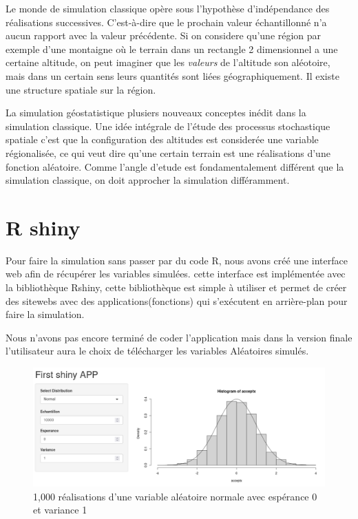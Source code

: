 \documentclass[10pt]{article} %
\begin{document}
Le monde de simulation classique opère sous l'hypothèse d'indépendance des réalisations successives. C'est-à-dire que le prochain
valeur échantillonné n'a aucun rapport avec la valeur précédente. Si on considere qu'une région par exemple d'une montaigne où le terrain
dans un rectangle 2 dimensionnel a une certaine altitude, on peut imaginer que les \textit{valeurs} de l'altitude son aléotoire, mais dans un
certain sens leurs quantités sont liées géographiquement. Il existe une structure spatiale sur la région.

La simulation géostatistique plusiers nouveaux conceptes inédit dans la simulation classique. Une idée intégrale de l'étude des processus
stochastique spatiale c'est que la configuration des altitudes est considerée une variable régionalisée, ce qui veut dire qu'une certain terrain
est une réalisations d'une fonction aléatoire. Comme l'angle d'etude est fondamentalement différent que la simulation classique, on doit approcher la simulation
différamment.



\section{R shiny}

Pour faire la simulation sans passer par du code R, nous avons créé une interface web afin de récupérer les variables simulées.
cette interface est implémentée avec la bibliothèque Rshiny, cette bibliothèque est simple à utiliser et permet de créer des sitewebs
avec des applications(fonctions) qui s'exécutent en arrière-plan pour faire la simulation.

Nous n'avons pas encore terminé de coder l'application mais dans la version finale l'utilisateur aura le choix de télécharger les variables
Aléatoires simulés.

\begin{figure}[h!]
\centering
\includegraphics[width=\linewidth]{media/apppic1.png}
\vspace{-5cm}
\caption{1,000 réalisations d'une variable aléatoire normale avec espérance 0 et variance 1}
\end{figure}
\end{document}
